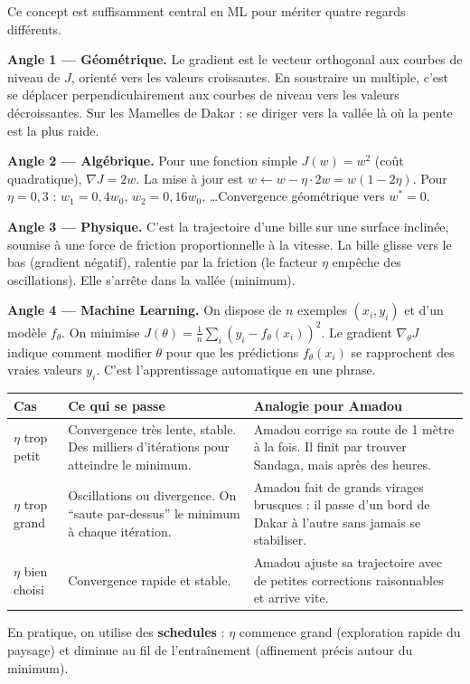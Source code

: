 \documentclass[11pt,a4paper]{article}
\begin{document}
Ce concept est suffisamment central en ML pour mériter quatre regards différents.

\textbf{Angle 1 --- Géométrique.} Le gradient est le vecteur orthogonal aux courbes de niveau de $J$, orienté vers les valeurs croissantes. En soustraire un multiple, c'est se déplacer perpendiculairement aux courbes de niveau vers les valeurs décroissantes. Sur les Mamelles de Dakar : se diriger vers la vallée là où la pente est la plus raide.

\textbf{Angle 2 --- Algébrique.} Pour une fonction simple $J(w) = w^2$ (coût quadratique), $\nabla J = 2w$. La mise à jour est $w \leftarrow w - \eta \cdot 2w = w(1 - 2\eta)$. Pour $\eta = 0{,}3$ : $w_1 = 0{,}4 w_0$, $w_2 = 0{,}16 w_0$, \ldots Convergence géométrique vers $w^* = 0$.

\textbf{Angle 3 --- Physique.} C'est la trajectoire d'une bille sur une surface inclinée, soumise à une force de friction proportionnelle à la vitesse. La bille glisse vers le bas (gradient négatif), ralentie par la friction (le facteur $\eta$ empêche des oscillations). Elle s'arrête dans la vallée (minimum).

\textbf{Angle 4 --- Machine Learning.} On dispose de $n$ exemples $(x_i, y_i)$ et d'un modèle $f_\theta$. On minimise $J(\theta) = \frac{1}{n}\sum_i (y_i - f_\theta(x_i))^2$. Le gradient $\nabla_\theta J$ indique comment modifier $\theta$ pour que les prédictions $f_\theta(x_i)$ se rapprochent des vraies valeurs $y_i$. C'est l'apprentissage automatique en une phrase.

\begin{attentionbox}
\begin{center}
\renewcommand{\arraystretch}{1.4}
\begin{tabular}{lp{5cm}p{5cm}}
\toprule
\textbf{Cas} & \textbf{Ce qui se passe} & \textbf{Analogie pour Amadou} \\
\midrule
$\eta$ trop petit & Convergence très lente, stable. Des milliers d'itérations pour atteindre le minimum. & Amadou corrige sa route de 1 mètre à la fois. Il finit par trouver Sandaga, mais après des heures. \\
$\eta$ trop grand & Oscillations ou divergence. On ``saute par-dessus'' le minimum à chaque itération. & Amadou fait de grands virages brusques : il passe d'un bord de Dakar à l'autre sans jamais se stabiliser. \\
$\eta$ bien choisi & Convergence rapide et stable. & Amadou ajuste sa trajectoire avec de petites corrections raisonnables et arrive vite. \\
\bottomrule
\end{tabular}
\end{center}
En pratique, on utilise des \textbf{schedules} : $\eta$ commence grand (exploration rapide du paysage) et diminue au fil de l'entraînement (affinement précis autour du minimum).
\end{attentionbox}
\end{document}
